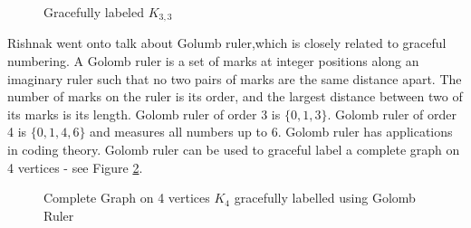 \begin{figure}
\begin{center}

\caption{Gracefully labeled $K_{3,3}$}\label{18g45}
\end{center}
\end{figure}
Rishnak went onto talk about Golumb ruler,which is closely related to graceful numbering.  A Golomb ruler is a set of marks at integer positions along an imaginary ruler such that no two pairs of marks are the same distance apart. The number of marks on the ruler is its order, and the largest distance between two of its marks is its length.
Golomb ruler of order 3 is $\{0,1,3\}$. Golomb ruler of order 4 is $\{0,1,4,6\}$ and measures all numbers up to 6. Golomb ruler has applications in coding theory. Golomb ruler can be used to graceful label a complete graph on 4 vertices - see Figure \ref{19g5}.
\begin{figure}
\begin{center}


\caption{Complete Graph on 4 vertices $K_4$ gracefully labelled using Golomb Ruler}\label{19g5}
\end{center}
\end{figure}

